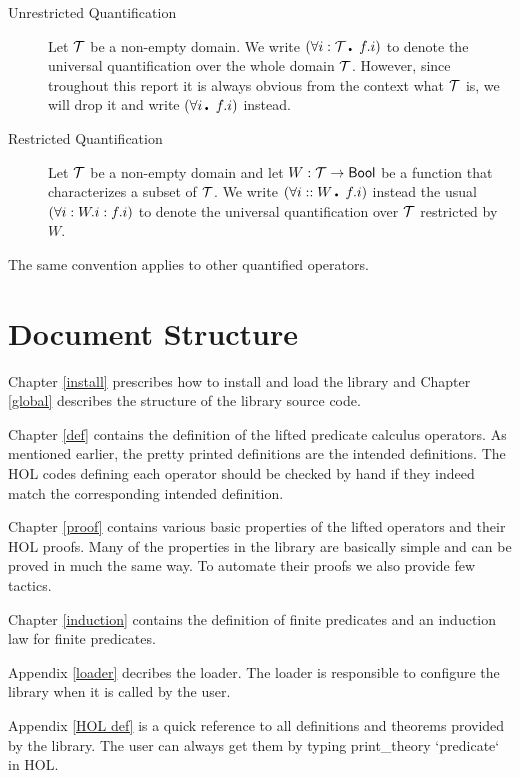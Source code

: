 \begin{description} 
\item[Unrestricted Quantification]
Let $\cal T$ be a non-empty domain.  We write $(\qA i:{\cal T}\Dot
f.i)$ to denote the universal quantification over the whole domain
$\cal T$. However, since troughout this report it is always obvious
from the context what $\cal T$ is, we will drop it and write
$(\qA i\Dot f.i)$ instead.

\item[Restricted Quantification]
Let $\cal T$ be a non-empty domain and let $W:{\cal T}\rightarrow{\sf Bool}$ be a
function that characterizes a subset of $\cal T$. We write $(\qA
i::W\Dot f.i)$ instead the usual $(\forall i:W.i: f.i)$ to denote the
universal quantification over $\cal T$ restricted by $W$.
\end{description}

The same convention applies to other quantified operators.

\section{Document Structure}

Chapter \ref{install} prescribes how to install and load the library
and Chapter \ref{global} describes the structure of the library source
code. 

Chapter \ref{def} contains the definition of the lifted predicate
calculus operators.  As mentioned earlier, the pretty printed
definitions are the intended definitions.  The HOL codes defining each
operator should be checked by hand if they indeed match the
corresponding intended definition.

Chapter \ref{proof} contains various basic properties of the lifted
operators and their HOL proofs. Many of the properties in the library
are basically simple and can be proved in much the same way. To
automate their proofs we also provide few tactics.

Chapter \ref{induction} contains the definition of finite predicates
and an induction law for finite predicates.

Appendix \ref{loader} decribes the loader. The loader is responsible
to configure the library when it is called by the user.

Appendix \ref{HOL def} is a quick reference to all definitions and
theorems provided by the library. The user can always get them by
typing \code{}print_theory\edoc{} \code{}`predicate`\edoc{} in HOL.

